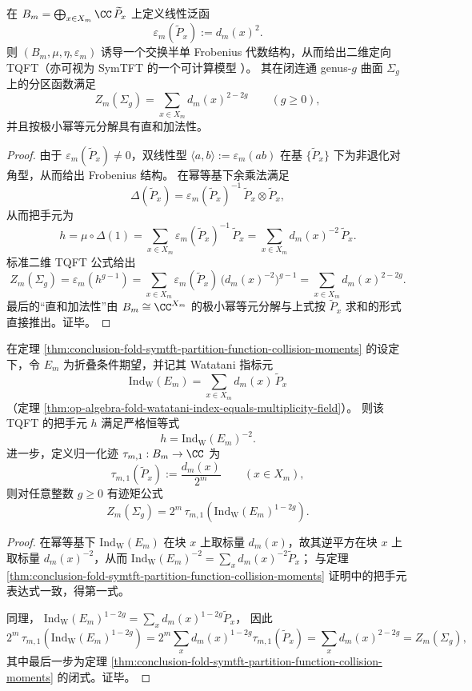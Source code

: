 \begin{theorem}\label{thm:conclusion-fold-symtft-partition-function-collision-moments}
在 \(B_m=\bigoplus_{x\in X_m}\CC\,\widetilde P_x\) 上定义线性泛函
\[
\varepsilon_m(\widetilde P_x):=d_m(x)^2.
\]
则 \((B_m,\mu,\eta,\varepsilon_m)\) 诱导一个交换半单 Frobenius 代数结构，从而给出二维定向 TQFT（亦可视为 SymTFT 的一个可计算模型 \cite{Bottini2025CategoricalSymmetriesQFT}）。
其在闭连通 genus-\(g\) 曲面 \(\Sigma_g\) 上的分区函数满足
\[
Z_m(\Sigma_g)=\sum_{x\in X_m} d_m(x)^{2-2g}\qquad(g\ge 0),
\]
并且按极小幂等元分解具有直和加法性。
\end{theorem}
\begin{proof}
由于 \(\varepsilon_m(\widetilde P_x)\neq 0\)，双线性型 \(\langle a,b\rangle:=\varepsilon_m(ab)\) 在基 \(\{\widetilde P_x\}\) 下为非退化对角型，从而给出 Frobenius 结构。
在幂等基下余乘法满足
\[
\Delta(\widetilde P_x)=\varepsilon_m(\widetilde P_x)^{-1}\,\widetilde P_x\otimes \widetilde P_x,
\]
从而把手元为
\[
h=\mu\circ\Delta(1)=\sum_{x\in X_m}\varepsilon_m(\widetilde P_x)^{-1}\,\widetilde P_x=\sum_{x\in X_m}d_m(x)^{-2}\,\widetilde P_x.
\]
标准二维 TQFT 公式给出
\[
Z_m(\Sigma_g)=\varepsilon_m(h^{g-1})
=\sum_{x\in X_m}\varepsilon_m(\widetilde P_x)\,\bigl(d_m(x)^{-2}\bigr)^{g-1}
=\sum_{x\in X_m}d_m(x)^{2-2g}.
\]
最后的“直和加法性”由 \(B_m\cong \CC^{X_m}\) 的极小幂等元分解与上式按 \(\widetilde P_x\) 求和的形式直接推出。证毕。
\end{proof}

\begin{proposition}\label{prop:conclusion-watatani-handle-identity-trace-moment}
在定理 \ref{thm:conclusion-fold-symtft-partition-function-collision-moments} 的设定下，令 \(E_m\) 为折叠条件期望，并记其 Watatani 指标元
\[
\mathrm{Ind}_{\mathrm W}(E_m)=\sum_{x\in X_m}d_m(x)\,\widetilde P_x
\]
（定理 \ref{thm:op-algebra-fold-watatani-index-equals-multiplicity-field}）。
则该 TQFT 的把手元 \(h\) 满足严格恒等式
\[
h=\mathrm{Ind}_{\mathrm W}(E_m)^{-2}.
\]
进一步，定义归一化迹 \(\tau_{m,1}:B_m\to\CC\) 为
\[
\tau_{m,1}(\widetilde P_x):=\frac{d_m(x)}{2^m}\qquad(x\in X_m),
\]
则对任意整数 \(g\ge 0\) 有迹矩公式
\[
Z_m(\Sigma_g)=2^m\,\tau_{m,1}\!\left(\mathrm{Ind}_{\mathrm W}(E_m)^{1-2g}\right).
\]
\end{proposition}
\begin{proof}
在幂等基下 \(\mathrm{Ind}_{\mathrm W}(E_m)\) 在块 \(x\) 上取标量 \(d_m(x)\)，故其逆平方在块 \(x\) 上取标量 \(d_m(x)^{-2}\)，从而
\(
\mathrm{Ind}_{\mathrm W}(E_m)^{-2}=\sum_x d_m(x)^{-2}\widetilde P_x
\)；
与定理 \ref{thm:conclusion-fold-symtft-partition-function-collision-moments} 证明中的把手元表达式一致，得第一式。
\par
同理，
\(
\mathrm{Ind}_{\mathrm W}(E_m)^{1-2g}=\sum_x d_m(x)^{1-2g}\widetilde P_x
\)，
因此
\[
2^m\,\tau_{m,1}\!\left(\mathrm{Ind}_{\mathrm W}(E_m)^{1-2g}\right)
=2^m\sum_x d_m(x)^{1-2g}\tau_{m,1}(\widetilde P_x)
=\sum_x d_m(x)^{2-2g}
=Z_m(\Sigma_g),
\]
其中最后一步为定理 \ref{thm:conclusion-fold-symtft-partition-function-collision-moments} 的闭式。证毕。
\end{proof}

